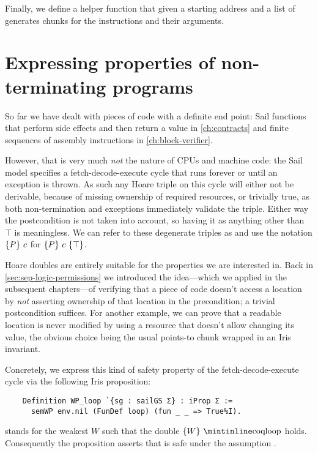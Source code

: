 Finally, we define a helper function  that given a starting address and a list of  generates  chunks for the instructions and their arguments.

\section{Expressing properties of non-terminating programs}
\label{sec:doubles}

So far we have dealt with pieces of code with a definite end point: Sail functions that perform side effects and then return a value in \cref{ch:contracts} and finite sequences of assembly instructions in \cref{ch:block-verifier}.

However, that is very much \emph{not} the nature of CPUs and machine code: the Sail model specifies a fetch-decode-execute cycle that runs forever or until an exception is thrown. As such any Hoare triple on this cycle will either not be derivable, \ie because of missing ownership of required resources, or trivially true, as both non-termination and exceptions immediately validate the triple. Either way the postcondition is not taken into account, so having it as anything other than \(\top\) is meaningless. We can refer to these degenerate triples as  and use the notation \(\left\{P\right\}\,c\) for \(\hoare{P}{c}{\top}\).

Hoare doubles are entirely suitable for the properties we are interested in. Back in \cref{sec:sep-logic-permissions} we introduced the idea---which we applied in the subsequent chapters---of verifying that a piece of code doesn't access a location by \emph{not} asserting ownership of that location in the precondition; a trivial postcondition suffices. For another example, we can prove that a readable location is never modified by using a resource that doesn't allow changing its value, the obvious choice being the usual points-to chunk wrapped in an Iris invariant.

Concretely, we express this kind of safety property of the fetch-decode-execute cycle via the following Iris proposition:
\begin{verbatim}
    Definition WP_loop `{sg : sailGS Σ} : iProp Σ :=
      semWP env.nil (FunDef loop) (fun _ _ => True%I).
\end{verbatim}
 stands for the weakest \(W\) such that the double \(\hoared{W}{\text{\coq{loop}}}\) holds. Consequently the proposition  asserts that  is safe under the assumption .

